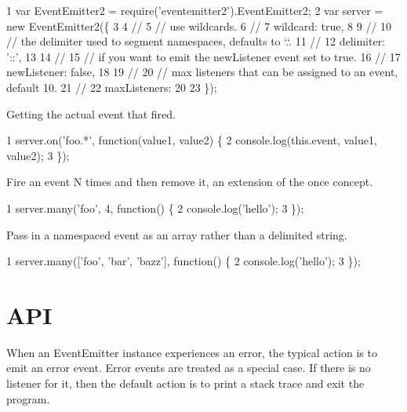 \begin{DoxyCode}
1 var EventEmitter2 = require('eventemitter2').EventEmitter2;
2 var server = new EventEmitter2(\{
3 
4   //
5   // use wildcards.
6   //
7   wildcard: true,
8 
9   //
10   // the delimiter used to segment namespaces, defaults to `.`.
11   //
12   delimiter: '::', 
13 
14   //
15   // if you want to emit the newListener event set to true.
16   //
17   newListener: false, 
18 
19   //
20   // max listeners that can be assigned to an event, default 10.
21   //
22   maxListeners: 20
23 \});
\end{DoxyCode}



\begin{DoxyItemize}
\item Getting the actual event that fired.
\end{DoxyItemize}


\begin{DoxyCode}
1 server.on('foo.*', function(value1, value2) \{
2   console.log(this.event, value1, value2);
3 \});
\end{DoxyCode}



\begin{DoxyItemize}
\item Fire an event N times and then remove it, an extension of the {\ttfamily once} concept.
\end{DoxyItemize}


\begin{DoxyCode}
1 server.many('foo', 4, function() \{
2   console.log('hello');
3 \});
\end{DoxyCode}



\begin{DoxyItemize}
\item Pass in a namespaced event as an array rather than a delimited string.
\end{DoxyItemize}


\begin{DoxyCode}
1 server.many(['foo', 'bar', 'bazz'], function() \{
2   console.log('hello');
3 \});
\end{DoxyCode}


\section*{A\+P\+I}

When an {\ttfamily Event\+Emitter} instance experiences an error, the typical action is to emit an {\ttfamily error} event. Error events are treated as a special case. If there is no listener for it, then the default action is to print a stack trace and exit the program.


